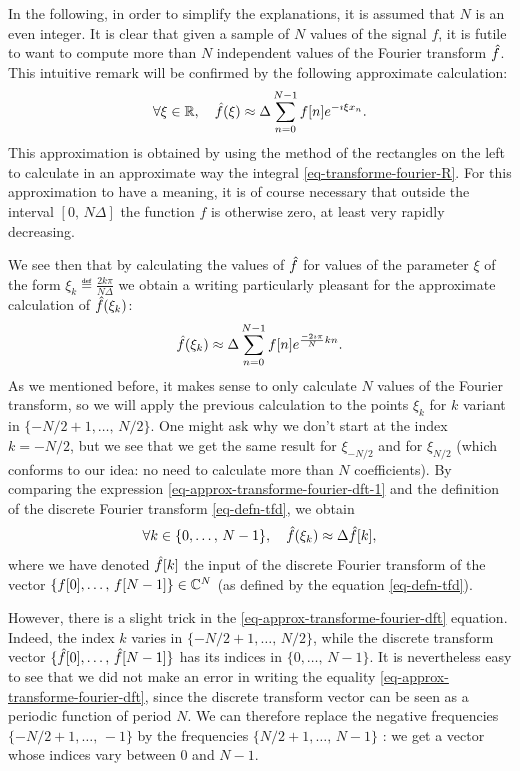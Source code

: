  
In the following, in order to simplify the explanations, it is assumed that $ N $ is an even integer. It is clear that given a sample of $ N $ values of the signal $ f $, it is futile to want to compute more than $ N $ independent values of the Fourier transform $ \hat{f} $. This intuitive remark will be confirmed by the following approximate calculation:
\begin{equation*}
\forall \xi \in \mathbb{R}, \quad \hat{f} (\xi) \approx \Delta \sum_{n = 0}^{N-1}{f [n] e^{- \imath \xi x_n}}.
\end{equation*}
This approximation is obtained by using the method of the rectangles on the left to calculate in an approximate way the integral \eqref{eq-transforme-fourier-R}. For this approximation to have a meaning, it is of course necessary that outside the interval $ [0, \, N \Delta] $ the function $ f $ is otherwise zero, at least very rapidly decreasing.
 
 
We see then that by calculating the values of $ \hat{f} $ for values of the parameter $ \xi $ of the form $ \xi_k \eqdef \frac{2k \pi}{N \Delta} $ we obtain a writing particularly pleasant for the approximate calculation of $ \hat{f} (\xi_k) $:
\begin{equation}
\label{eq-approx-transforme-fourier-dft-1}
\hat{f} (\xi_k) \approx \Delta \sum_{n = 0}^{N-1}{f [n] e^{\frac{- 2 \imath \pi}{N} kn}} .
\end{equation}
As we mentioned before, it makes sense to only calculate $ N $ values of the Fourier transform, so we will apply the previous calculation to the points $ \xi_k $ for $ k $ variant in $ \{- N / 2 + 1, \ldots, \, N / 2 \} $. One might ask why we don't start at the index $ k = -N / 2 $, but we see that we get the same result for $ \xi_{- N / 2} $ and for $ \xi_{N / 2} $ (which conforms to our idea: no need to calculate more than $ N $ coefficients). By comparing the expression \eqref{eq-approx-transforme-fourier-dft-1} and the definition of the discrete Fourier transform \eqref{eq-defn-tfd}, we obtain
\begin{equation}
\label{eq-approx-transforme-fourier-dft}
\forall k \in \{0, \ldots, \, N-1 \}, \quad \hat{f} (\xi_k) \approx \Delta \hat{f}[k],
\end{equation}
where we have denoted $ \hat{f}[k] $ the  input of the discrete Fourier transform of the vector $ \{f [0], \ldots, \, f [N -1] \} \in \mathbb{C}^N $ (as defined by the equation \eqref{eq-defn-tfd}).
 
 
However, there is a slight trick in the \eqref{eq-approx-transforme-fourier-dft} equation. Indeed, the index $ k $ varies in $ \{-N / 2 + 1, \ldots, \, N / 2 \} $, while the discrete transform vector $ \{\hat{f}[0 ], \ldots, \, \hat{f}[N-1] \} $ has its indices in $ \{0, \ldots, \, N-1 \} $. It is nevertheless easy to see that we did not make an error in writing the equality \eqref{eq-approx-transforme-fourier-dft}, since the discrete transform vector can be seen as a periodic function of period $ N $. We can therefore replace the negative frequencies $ \{- N / 2 + 1, \ldots, \, -1 \} $ by the frequencies $ \{N / 2 + 1, \ldots, \, N-1 \} $ : we get a vector whose indices vary between $ 0 $ and $ N-1 $.
 
